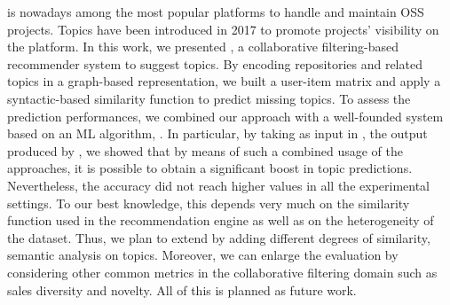 \GH is nowadays among the most popular platforms to handle and maintain OSS projects. 
Topics have been introduced in 2017 to promote projects' visibility on the 
platform. 
In this work, we presented \TF, a collaborative filtering-based recommender 
system to suggest \GH topics.  By encoding repositories and related topics in a 
graph-based representation, we built a user-item matrix and apply a 
syntactic-based similarity function to predict missing topics.
To assess the prediction performances, we combined our approach with a well-founded system based on an ML algorithm, \ie \MNB. In particular, by taking as input in \TF, the 
output produced by \MNB, we showed that by means of such a combined usage of the approaches, it is possible to obtain a significant boost in topic predictions. 
Nevertheless, the accuracy did not reach higher values in all the experimental 
settings. To our best knowledge, this depends very much on the similarity function used in 
the recommendation engine as well as on the heterogeneity of the dataset. Thus, 
we plan to extend \TF by adding different degrees of similarity, \eg 
semantic analysis on topics. Moreover, we can enlarge the evaluation by 
considering other common metrics in the collaborative filtering domain such as 
sales diversity and novelty. All of this is planned as future work.
